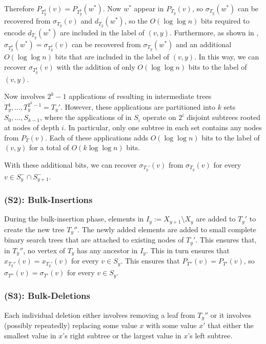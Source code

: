 \documentclass[kpfonts]{patmorin}
\begin{document}
Therefore $P_{T_y^1}(v)=P_{T_y^1}(w^*)$.  Now $w^*$ appear in $P_{T_y}(v)$, so $\sigma_{T_y}(w^*)$ can be recovered from $\sigma_{T_y}(v)$ and $d_{T_y}(w^*)$, so the $O(\log\log n)$ bits required to encode $d_{T_y}(w^*)$ are included in the label of $(v,y)$.  Furthermore, as shown in , $\sigma_{T_y^1}(w^*)=\sigma_{T_y^1}(v)$ can be recovered from $\sigma_{T_y}(w^*)$ and an additional $O(\log\log n)$ bits that are included in the label of $(v,y)$.  In this way, we can recover $\sigma_{T_y^1}(v)$ with the addition of only $O(\log\log n)$ bits to the label of $(v,y)$.

Now  involves $2^k-1$ applications of  resulting in intermediate trees $T_y^1,\ldots,T_y^{2^k-1}=T_y'$.  However, these applications are partitioned into $k$ sets $S_0,\ldots,S_{k-1}$, where the applications of  in $S_i$ operate on $2^i$ disjoint subtrees rooted at nodes of depth $i$.  In particular, only one subtree in each set contains any nodes from $P_{T}(v)$.  Each of these applications adds $O(\log\log n)$ bits to the label of $(v,y)$ for a total of $O(k\log\log n)$ bits.

With these additional bits, we can recover $\sigma_{T_y'}(v)$ from $\sigma_{T_y}(v)$ for every $v\in S^-_y\cap S^-_{y+1}$.

\subsubsection{(S2): Bulk-Insertions}

During the bulk-insertion phase, elements in $I_y:=X_{y+1}\setminus X_y$ are added to $T_y'$ to create the new tree $T_{y}''$.  The newly added elements are added to small complete binary search trees that are attached to existing nodes of $T_{y}'$.  This ensures that, in $T_y''$, no vertex of $T_y$ has any ancestor in $I_y$.  This in turn ensures that $x_{T_y''}(v)=x_{T_y'}(v)$ for every $v\in S_y$.  This ensures that $P_{T''}(v)=P_{T'}(v)$, so $\sigma_{T''}(v)=\sigma_{T'}(v)$ for every $v\in S_y$.

\subsubsection{(S3): Bulk-Deletions}

Each individual deletion either involves removing a leaf from $T_y''$ or it involves (possibly repeatedly) replacing some value $x$ with some value $x'$ that either the smallest value in $x$'s right subtree or the largest value in $x$'s left subtree.
\end{document}
